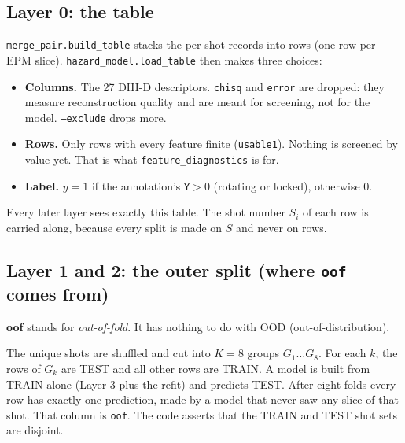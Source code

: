 \documentclass[11pt]{article}
\begin{document}
\subsection{Layer 0: the table}

\texttt{merge\_pair.build\_table} stacks the per-shot records into rows (one
row per EPM slice). \texttt{hazard\_model.load\_table} then makes three
choices:
\begin{itemize}
\item \textbf{Columns.} The 27 DIII-D descriptors. \texttt{chisq} and
  \texttt{error} are dropped: they measure reconstruction quality and are
  meant for screening, not for the model. \texttt{--exclude} drops more.
\item \textbf{Rows.} Only rows with every feature finite (\texttt{usable1}).
  Nothing is screened by value yet. That is what \texttt{feature\_diagnostics}
  is for.
\item \textbf{Label.} $y=1$ if the annotation's \texttt{Y}$>0$ (rotating or
  locked), otherwise $0$.
\end{itemize}
Every later layer sees exactly this table. The shot number $S_i$ of each row is
carried along, because every split is made on $S$ and never on rows.

\subsection{Layer 1 and 2: the outer split (where \texttt{oof} comes from)}\label{sec:oof}

\textbf{oof} stands for \emph{out-of-fold}. It has nothing to do with OOD
(out-of-distribution).

The unique shots are shuffled and cut into $K=8$ groups $G_1\dots G_8$. For
each $k$, the rows of $G_k$ are TEST and all other rows are TRAIN. A model is
built from TRAIN alone (Layer 3 plus the refit) and predicts TEST. After eight
folds every row has exactly one prediction, made by a model that never saw any
slice of that shot. That column is \texttt{oof}. The code asserts that the
TRAIN and TEST shot sets are disjoint.

\begin{center}
\end{center}
\end{document}
